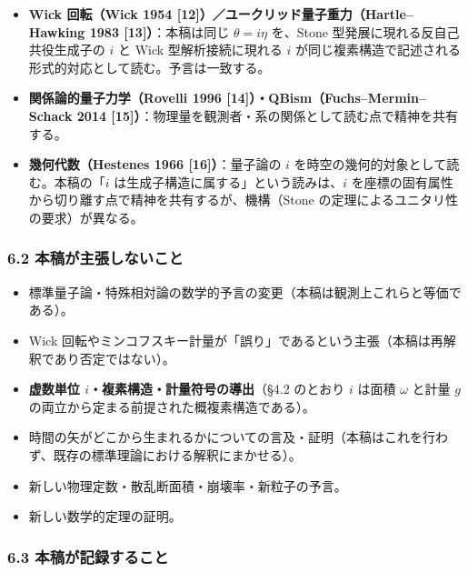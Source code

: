 \documentclass[
]{ltjsarticle}
\providecommand{\tightlist}{%
  \setlength{\itemsep}{0pt}\setlength{\parskip}{0pt}}
\begin{document}
\begin{itemize}
\tightlist
\item
  \textbf{Wick 回転（Wick 1954
  {[}12{]}）／ユークリッド量子重力（Hartle--Hawking 1983
  {[}13{]}）}：本稿は同じ \(\theta=i\eta\) を、Stone
  型発展に現れる反自己共役生成子の \(i\) と Wick 型解析接続に現れる
  \(i\) が同じ複素構造で記述される形式的対応として読む。予言は一致する。
\item
  \textbf{関係論的量子力学（Rovelli 1996
  {[}14{]}）・QBism（Fuchs--Mermin--Schack 2014
  {[}15{]}）}：物理量を観測者・系の関係として読む点で精神を共有する。
\item
  \textbf{幾何代数（Hestenes 1966 {[}16{]}）}：量子論の \(i\)
  を時空の幾何的対象として読む。本稿の「\(i\)
  は生成子構造に属する」という読みは、\(i\)
  を座標の固有属性から切り離す点で精神を共有するが、機構（Stone
  の定理によるユニタリ性の要求）が異なる。
\end{itemize}

\subsubsection{6.2
本稿が主張しないこと}\label{ux672cux7a3fux304cux4e3bux5f35ux3057ux306aux3044ux3053ux3068}

\begin{itemize}
\tightlist
\item
  標準量子論・特殊相対論の数学的予言の変更（本稿は観測上これらと等価である）。
\item
  Wick
  回転やミンコフスキー計量が「誤り」であるという主張（本稿は再解釈であり否定ではない）。
\item
  \textbf{虚数単位 \(i\)・複素構造・計量符号の導出}（§4.2 のとおり \(i\)
  は面積 \(\omega\) と計量 \(g\)
  の両立から定まる前提された概複素構造である）。
\item
  時間の矢がどこから生まれるかについての言及・証明（本稿はこれを行わず、既存の標準理論における解釈にまかせる）。
\item
  新しい物理定数・散乱断面積・崩壊率・新粒子の予言。
\item
  新しい数学的定理の証明。
\end{itemize}

\subsubsection{6.3
本稿が記録すること}\label{ux672cux7a3fux304cux8a18ux9332ux3059ux308bux3053ux3068}
\end{document}

